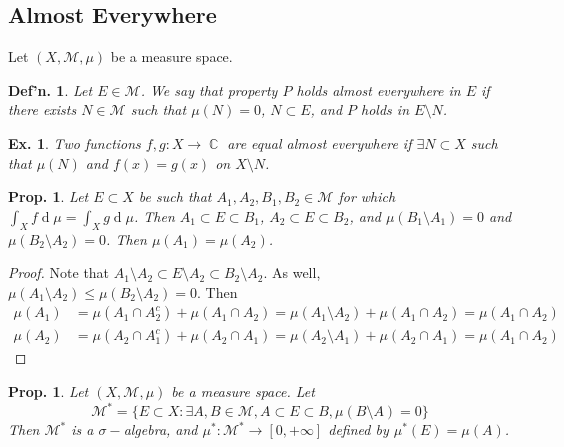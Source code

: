 \documentclass[12pt, a4paper]{book}
\DeclareMathOperator{\C}{\mathbb{C}}
\renewcommand{\d}[1]{\ensuremath{\operatorname{d}\!{#1}}} %
\newtheorem{definition}[theorem]{Def'n.}
\newtheorem{proposition}[theorem]{Prop.}
\newtheorem{example}[theorem]{Ex.}
\theoremstyle{nonumberplain}
\newtheorem{proof}{Proof}
\begin{document}
\subsection{Almost Everywhere}
Let $(X,\mathcal{M},\mu)$ be a measure space.
\begin{definition}
    Let $E\in\mathcal{M}$.
    We say that property $P$ holds almost everywhere in $E$ if there exists $N\in\mathcal{M}$ such that $\mu(N)=0$, $N\subset E$, and $P$ holds in $E\setminus N$.
\end{definition}
\begin{example}
    Two functions $f,g:X\to\C$ are equal almost everywhere if $\exists N\subset X$ such that $\mu(N)$ and $f(x)=g(x)$ on $X\setminus N$.
\end{example}
\begin{proposition}
    Let $E\subset X$ be such that $A_1,A_2,B_1,B_2\in\mathcal{M}$ for which $\int_X f\d{\mu}=\int_X g\d{\mu}$.
    Then $A_1\subset E\subset B_1$, $A_2\subset E\subset B_2$, and $\mu(B_1\setminus A_1)=0$ and $\mu(B_2\setminus A_2)=0$.
    Then $\mu(A_1)=\mu(A_2)$.
\end{proposition}
\begin{proof}
    Note that $A_1\setminus A_2\subset E\setminus A_2\subset B_2\setminus A_2$.
    As well, $\mu(A_1\setminus A_2)\leq \mu(B_2\setminus A_2)=0$.
    Then
    \begin{align*}
        \mu(A_1)&=\mu(A_1\cap A_2^c)+\mu(A_1\cap A_2)=\mu(A_1\setminus A_2)+\mu(A_1\cap A_2)=\mu(A_1\cap A_2)\\
        \mu(A_2)&=\mu(A_2\cap A_1^c)+\mu(A_2\cap A_1)=\mu(A_2\setminus A_1)+\mu(A_2\cap A_1)=\mu(A_1\cap A_2)
    \end{align*}
\end{proof}
\begin{proposition}
    Let $(X,\mathcal{M},\mu)$ be a measure space.
    Let
    \[\mathcal{M}^*=\{E\subset X:\exists A,B\in\mathcal{M}, A\subset E\subset B,\mu(B\setminus A)=0\}\]
    Then $\mathcal{M}^*$ is a $\sigma-$algebra, and $\mu^*:\mathcal{M}^*\to[0,+\infty]$ defined by $\mu^*(E)=\mu(A)$.
\end{proposition}
\end{document}
